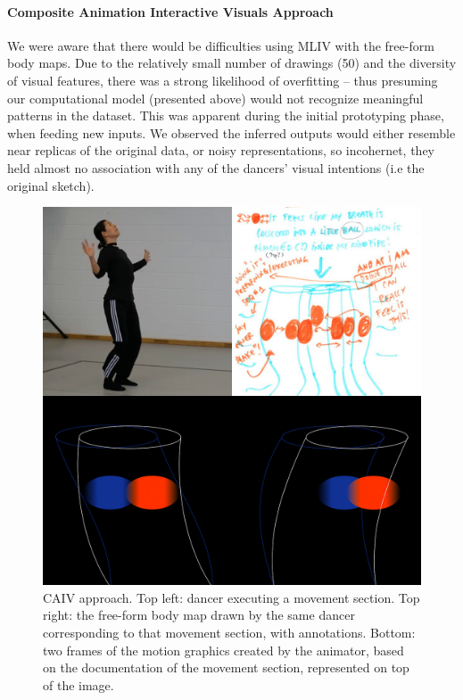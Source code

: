

\paragraph{Composite Animation Interactive Visuals Approach}

We were aware that there would be difficulties using MLIV with the free-form body maps. Due to the relatively small number of drawings (50) and the diversity of visual features, there was a strong likelihood of overfitting – thus presuming our computational model (presented above) would not recognize meaningful patterns in the dataset. This was apparent during the initial prototyping phase, when feeding new inputs. We observed the inferred outputs would either resemble near replicas of the original data, or noisy representations, so incohernet, they held almost no association with any of the dancers’ visual intentions (i.e the original sketch).

\begin{figure}[ht]
  \centering
  \includegraphics[width=0.65\linewidth]{Chapters/Figures/modi_dis/Stage1-animation.jpg}
  \caption{CAIV approach. Top left: dancer executing a movement section. Top right: the free-form body map drawn by the same dancer corresponding to that movement section, with annotations. Bottom: two frames of the motion graphics created by the animator, based on the documentation of the movement section, represented on top of the image.}
    \label{fig:Stage1-animation}
\end{figure}

